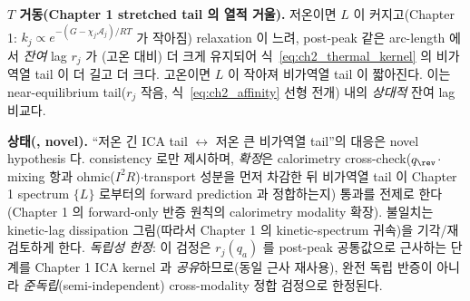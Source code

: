\textbf{$T$ 거동(Chapter 1 stretched tail 의 열적 거울).} 저온이면 $L$ 이 커지고(Chapter 1: $k_j\propto e^{-(G-\chi_j\mathcal A_j)/RT}$
가 작아짐) relaxation 이 느려, post-peak 같은 arc-length 에서 \emph{잔여} lag $r_j$ 가 (고온 대비) 더 크게
유지되어 식~\eqref{eq:ch2_thermal_kernel} 의 비가역열 tail 이 더 길고 더 크다. 고온이면 $L$ 이 작아져 비가역열
tail 이 짧아진다. 이는 near-equilibrium tail($r_j$ 작음, 식~\eqref{eq:ch2_affinity} 선형 전개) 내의 \emph{상대적}
잔여 lag 비교다.
\begin{flagbox}
\textbf{상태(, novel).} ``저온 긴 ICA tail $\leftrightarrow$ 저온 큰 비가역열 tail''의 대응은 novel
hypothesis 다. consistency 로만 제시하며, \emph{확정}은 calorimetry cross-check($q_\rev$$\cdot$mixing 항과
ohmic($I^2R$)$\cdot$transport 성분을 먼저 차감한 뒤 비가역열 tail 이 Chapter 1 spectrum $\{L\}$ 로부터의
forward prediction 과 정합하는지) 통과를
전제로 한다(Chapter 1 의 forward-only 반증 원칙의 calorimetry modality 확장). 불일치는 kinetic-lag dissipation
그림(따라서 Chapter 1 의 kinetic-spectrum 귀속)을 기각/재검토하게 한다. \emph{독립성 한정}: 이 검정은 $r_j(q_a)$
를 post-peak 공통값으로 근사하는 단계를 Chapter 1 ICA kernel 과 \emph{공유}하므로(동일 근사 재사용), 완전 독립
반증이 아니라 \emph{준독립}(semi-independent) cross-modality 정합 검정으로 한정된다.
\end{flagbox}

